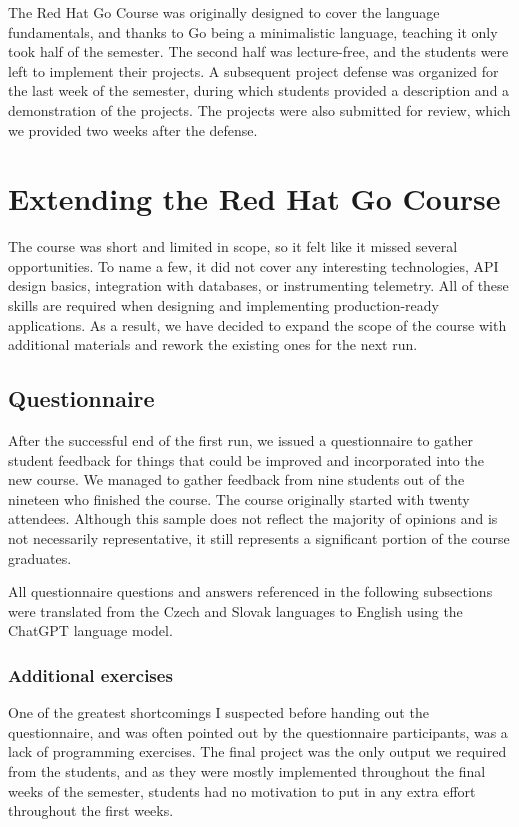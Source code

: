 \documentclass[
  digital,
  color,
  oneside,
  nosansbold,
  nocolorbold,
  nolof,
  nolot,
]{fithesis4}
\begin{document}
The Red Hat Go Course was originally designed to cover the language fundamentals, and thanks to Go being a minimalistic language, teaching it only took half of the semester. The second half was lecture-free, and the students were left to implement their projects. A subsequent project defense was organized for the last week of the semester, during which students provided a description and a demonstration of the projects. The projects were also submitted for review, which we provided two weeks after the defense.

\section{Extending the Red Hat Go Course}

The course was short and limited in scope, so it felt like it missed several opportunities. To name a few, it did not cover any interesting technologies, API design basics, integration with databases, or instrumenting telemetry. All of these skills are required when designing and implementing production-ready applications. As a result, we have decided to expand the scope of the course with additional materials and rework the existing ones for the next run.

\subsection{Questionnaire}

After the successful end of the first run, we issued a questionnaire to gather student feedback for things that could be improved and incorporated into the new course. We managed to gather feedback from nine students out of the nineteen who finished the course. The course originally started with twenty attendees. Although this sample does not reflect the majority of opinions and is not necessarily representative, it still represents a significant portion of the course graduates.

All questionnaire questions and answers referenced in the following subsections were translated from the Czech and Slovak languages to English using the ChatGPT\cite{chatgpt} language model.

\subsubsection{Additional exercises}\label{additional-exercises}

One of the greatest shortcomings I suspected before handing out the questionnaire, and was often pointed out by the questionnaire participants, was a lack of programming exercises. The final project was the only output we required from the students, and as they were mostly implemented throughout the final weeks of the semester, students had no motivation to put in any extra effort throughout the first weeks.
\end{document}
